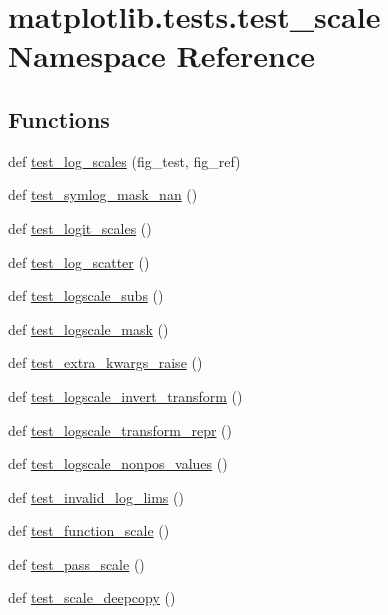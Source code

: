 \hypertarget{namespacematplotlib_1_1tests_1_1test__scale}{}\section{matplotlib.\+tests.\+test\+\_\+scale Namespace Reference}
\label{namespacematplotlib_1_1tests_1_1test__scale}
\subsection*{Functions}
\begin{DoxyCompactItemize}
\item 
def \hyperlink{namespacematplotlib_1_1tests_1_1test__scale_ad1af94893fcf9df5c9b01dd40e9461d5}{test\+\_\+log\+\_\+scales} (fig\+\_\+test, fig\+\_\+ref)
\item 
def \hyperlink{namespacematplotlib_1_1tests_1_1test__scale_ae6903922e6b2144bcebac98e476accd0}{test\+\_\+symlog\+\_\+mask\+\_\+nan} ()
\item 
def \hyperlink{namespacematplotlib_1_1tests_1_1test__scale_a6a1825ca4b9a5af5fb70ce6a0667d8b1}{test\+\_\+logit\+\_\+scales} ()
\item 
def \hyperlink{namespacematplotlib_1_1tests_1_1test__scale_ae7e8ef17dce0e5ce4c5f3f352c7a0d27}{test\+\_\+log\+\_\+scatter} ()
\item 
def \hyperlink{namespacematplotlib_1_1tests_1_1test__scale_ae40925e7e1153028524eadafe8bba9cf}{test\+\_\+logscale\+\_\+subs} ()
\item 
def \hyperlink{namespacematplotlib_1_1tests_1_1test__scale_a2f41a0e496bb57b2eae3b5a8903c91e6}{test\+\_\+logscale\+\_\+mask} ()
\item 
def \hyperlink{namespacematplotlib_1_1tests_1_1test__scale_af01ac5dd48ce8eea0cc2cba981e4523d}{test\+\_\+extra\+\_\+kwargs\+\_\+raise} ()
\item 
def \hyperlink{namespacematplotlib_1_1tests_1_1test__scale_a2eab20003f63ed920d224c424d2049df}{test\+\_\+logscale\+\_\+invert\+\_\+transform} ()
\item 
def \hyperlink{namespacematplotlib_1_1tests_1_1test__scale_a58c42c406b3d3226001a4e2ea79ba027}{test\+\_\+logscale\+\_\+transform\+\_\+repr} ()
\item 
def \hyperlink{namespacematplotlib_1_1tests_1_1test__scale_a08908bedb9a211f51606cac50f42a442}{test\+\_\+logscale\+\_\+nonpos\+\_\+values} ()
\item 
def \hyperlink{namespacematplotlib_1_1tests_1_1test__scale_ac170166ec3fa10221180e87b0c3e3991}{test\+\_\+invalid\+\_\+log\+\_\+lims} ()
\item 
def \hyperlink{namespacematplotlib_1_1tests_1_1test__scale_a75f643cc54d2a2f952fd279ffea68805}{test\+\_\+function\+\_\+scale} ()
\item 
def \hyperlink{namespacematplotlib_1_1tests_1_1test__scale_ae35f299a1b8021d110e318e5417c8358}{test\+\_\+pass\+\_\+scale} ()
\item 
def \hyperlink{namespacematplotlib_1_1tests_1_1test__scale_a8c1c5dedeef9dd2f4e8af7f4a28ab683}{test\+\_\+scale\+\_\+deepcopy} ()
\end{DoxyCompactItemize}


